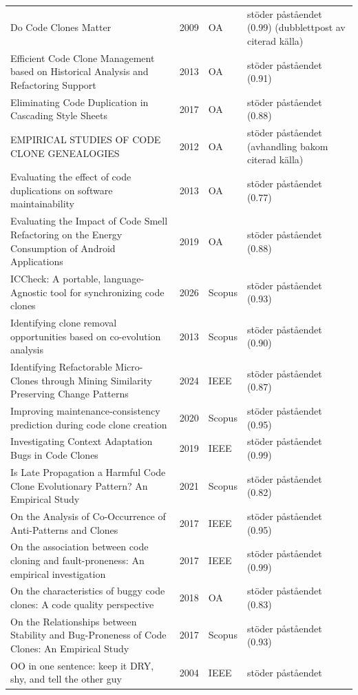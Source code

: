 \begin{longtable}{@{}%
  >{\raggedright\arraybackslash}p{}c%
  >{\raggedright\arraybackslash}p{}%
  >{\raggedright\arraybackslash}p{}@{}}
Do Code Clones Matter & 2009 & OA & stöder påståendet (0.99) (dubblettpost av citerad källa) \\
Efficient Code Clone Management based on Historical Analysis and Refactoring Support & 2013 & OA & stöder påståendet (0.91) \\
Eliminating Code Duplication in Cascading Style Sheets & 2017 & OA & stöder påståendet (0.88) \\
EMPIRICAL STUDIES OF CODE CLONE GENEALOGIES & 2012 & OA & stöder påståendet (avhandling bakom citerad källa) \\
Evaluating the effect of code duplications on software maintainability & 2013 & OA & stöder påståendet (0.77) \\
Evaluating the Impact of Code Smell Refactoring on the Energy Consumption of Android Applications & 2019 & OA & stöder påståendet (0.88) \\
ICCheck: A portable, language-Agnostic tool for synchronizing code clones & 2026 & Scopus & stöder påståendet (0.93) \\
Identifying clone removal opportunities based on co-evolution analysis & 2013 & Scopus & stöder påståendet (0.90) \\
Identifying Refactorable Micro-Clones through Mining Similarity Preserving Change Patterns & 2024 & IEEE & stöder påståendet (0.87) \\
Improving maintenance-consistency prediction during code clone creation & 2020 & Scopus & stöder påståendet (0.95) \\
Investigating Context Adaptation Bugs in Code Clones & 2019 & IEEE & stöder påståendet (0.99) \\
Is Late Propagation a Harmful Code Clone Evolutionary Pattern? An Empirical Study & 2021 & Scopus & stöder påståendet (0.82) \\
On the Analysis of Co-Occurrence of Anti-Patterns and Clones & 2017 & IEEE & stöder påståendet (0.95) \\
On the association between code cloning and fault-proneness: An empirical investigation & 2017 & IEEE & stöder påståendet (0.99) \\
On the characteristics of buggy code clones: A code quality perspective & 2018 & OA & stöder påståendet (0.83) \\
On the Relationships between Stability and Bug-Proneness of Code Clones: An Empirical Study & 2017 & Scopus & stöder påståendet (0.93) \\
OO in one sentence: keep it DRY, shy, and tell the other guy & 2004 & IEEE & stöder påståendet \\

\end{longtable}
